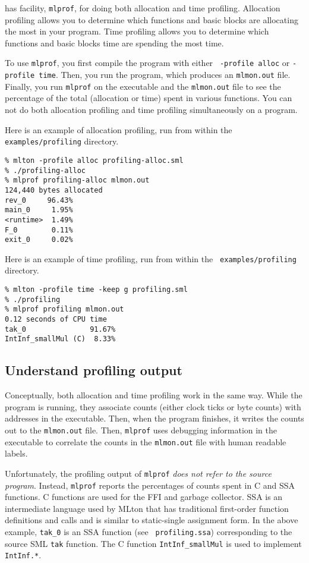 
{\mlton} has facility, {\tt mlprof}, for doing both allocation and
time profiling.  Allocation profiling allows you to determine which
functions and basic blocks are allocating the most in your program.
Time profiling allows you to determine which functions and basic
blocks time are spending the most time.

To use {\tt mlprof}, you first compile the program with either {\tt
-profile alloc} or {\tt -profile time}.  Then, you run the program,
which produces an {\tt mlmon.out} file.  Finally, you run {\tt mlprof}
on the executable and the {\tt mlmon.out} file to see the percentage
of the total (allocation or time) spent in various functions.
You can not do both allocation profiling and time profiling
simultaneously on a program.

Here is an example of allocation profiling, run from within the {\tt
examples/profiling} directory.

\begin{verbatim}
% mlton -profile alloc profiling-alloc.sml
% ./profiling-alloc
% mlprof profiling-alloc mlmon.out
124,440 bytes allocated
rev_0     96.43%
main_0     1.95%
<runtime>  1.49%
F_0        0.11%
exit_0     0.02%
\end{verbatim}

Here is an example of time profiling, run from within the {\tt
examples/profiling} directory.

\begin{verbatim}
% mlton -profile time -keep g profiling.sml
% ./profiling
% mlprof profiling mlmon.out
0.12 seconds of CPU time
tak_0               91.67%
IntInf_smallMul (C)  8.33%
\end{verbatim}

\subsection{Understand profiling output}

Conceptually, both allocation and time profiling work in the same way.
While the program is running, they associate counts (either clock
ticks or byte counts) with addresses in the executable.  Then, when
the program finishes, it writes the counts out to the {\tt mlmon.out}
file.  Then, {\tt mlprof} uses debugging information in the executable
to correlate the counts in the {\tt mlmon.out} file with human
readable labels.

Unfortunately, the profiling output of {\tt mlprof} {\em does not
refer to the source program}.  Instead, {\tt mlprof} reports the
percentages of counts spent in C and SSA functions.  C functions are
used for the FFI and garbage collector.  SSA is an intermediate
language used by MLton that has traditional first-order function
definitions and calls and is similar to static-single assignment form.
In the above example, {\tt tak\_0} is an SSA function (see {\tt
profiling.ssa}) corresponding to the source SML {\tt tak} function.
The C function {\tt IntInf\_smallMul} is used to implement {\tt
IntInf.*}.

